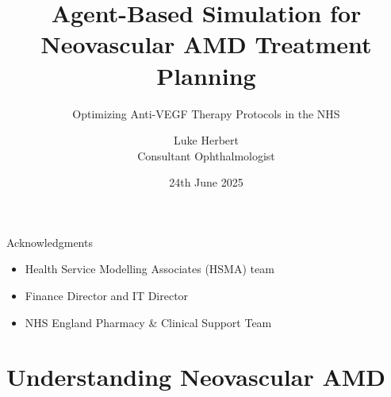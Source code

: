 \documentclass[10pt,aspectratio=169]{beamer}
\title{Agent-Based Simulation for Neovascular AMD Treatment Planning}
\subtitle{Optimizing Anti-VEGF Therapy Protocols in the NHS}
\author{Luke Herbert\\Consultant Ophthalmologist}
\institute{Surrey and Sussex Healthcare NHS Trust}
\date{24th June 2025}
\begin{document}
\maketitle

\begin{frame}{Acknowledgments}
\begin{itemize}
    \item Health Service Modelling Associates (HSMA) team
    \item Finance Director and IT Director
    \item NHS England Pharmacy \& Clinical Support Team
\end{itemize}
\end{frame}

\section{Understanding Neovascular AMD}
\end{document}
